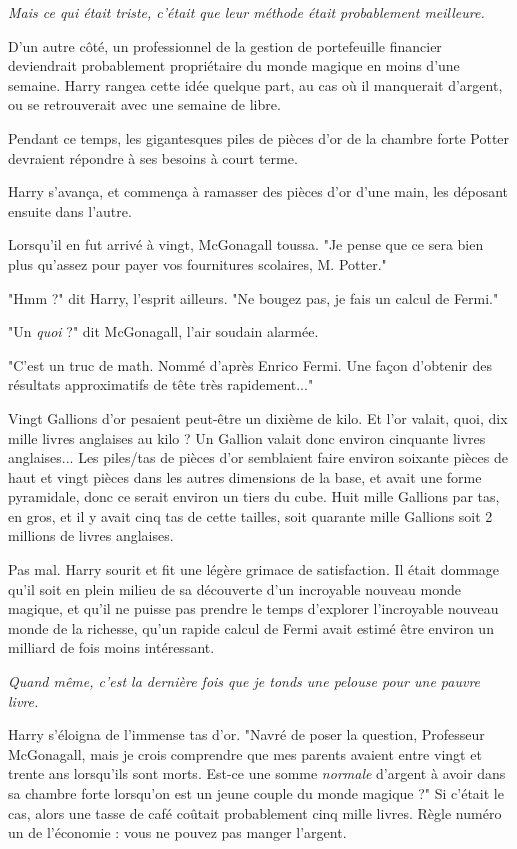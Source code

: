 \emph{Mais ce qui était triste, c'était que leur méthode était probablement meilleure.} 

D'un autre côté, un professionnel de la gestion de portefeuille financier deviendrait probablement propriétaire du monde magique en moins d'une semaine. Harry rangea cette idée quelque part, au cas où il manquerait d'argent, ou se retrouverait avec une semaine de libre.

Pendant ce temps, les gigantesques piles de pièces d'or de la chambre forte Potter devraient répondre à ses besoins à court terme.

Harry s'avança, et commença à ramasser des pièces d'or d'une main, les déposant ensuite dans l'autre.

Lorsqu'il en fut arrivé à vingt, McGonagall toussa. "Je pense que ce sera bien plus qu'assez pour payer vos fournitures scolaires, M. Potter."

"Hmm ?" dit Harry, l'esprit ailleurs. "Ne bougez pas, je fais un calcul de Fermi."

"Un \emph{quoi}  ?" dit McGonagall, l'air soudain alarmée.

"C'est un truc de math. Nommé d'après Enrico Fermi. Une façon d'obtenir des résultats approximatifs de tête très rapidement..."

Vingt Gallions d'or pesaient peut-être un dixième de kilo. Et l'or valait, quoi, dix mille livres anglaises au kilo ? Un Gallion valait donc environ cinquante livres anglaises... Les piles/tas de pièces d'or semblaient faire environ soixante pièces de haut et vingt pièces dans les autres dimensions de la base, et avait une forme pyramidale, donc ce serait environ un tiers du cube. Huit mille Gallions par tas, en gros, et il y avait cinq tas de cette tailles, soit quarante mille Gallions soit 2 millions de livres anglaises.

Pas mal. Harry sourit et fit une légère grimace de satisfaction. Il était dommage qu'il soit en plein milieu de sa découverte d'un incroyable nouveau monde magique, et qu'il ne puisse pas prendre le temps d'explorer l'incroyable nouveau monde de la richesse, qu'un rapide calcul de Fermi avait estimé être environ un milliard de fois moins intéressant.

\emph{Quand même, c'est la dernière fois que je tonds une pelouse pour une pauvre livre.} 

Harry s'éloigna de l'immense tas d'or. "Navré de poser la question, Professeur McGonagall, mais je crois comprendre que mes parents avaient entre vingt et trente ans lorsqu'ils sont morts. Est-ce une somme \emph{normale}  d'argent à avoir dans sa chambre forte lorsqu'on est un jeune couple du monde magique ?" Si c'était le cas, alors une tasse de café coûtait probablement cinq mille livres. Règle numéro un de l'économie : vous ne pouvez pas manger l'argent.

